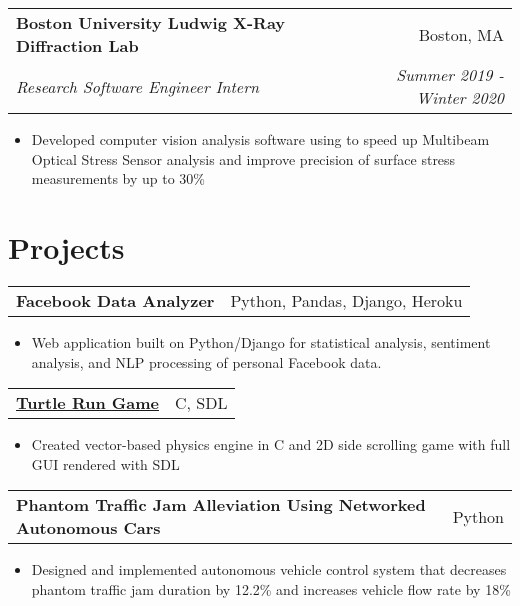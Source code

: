 \documentclass[letterpaper,11pt]{article}
\makeatletter
\newcommand{\resitem}[1]{\item[--] #1 \vspace{-8pt}}
\newcommand{\ressubheading}[4]{
	\vspace{6pt}
	\begin{tabular*}{7.5in}{l@{\extracolsep{\fill}}r}
			\textbf{#1} & #2 \\
			\textit{#3} & \textit{#4}
	\end{tabular*}
	\vspace{-12pt}
}
\newcommand{\projsubheading}[2]{
	\vspace{6pt}
	\begin{tabular*}{7.5in}{l@{\extracolsep{\fill}}r}
		\textbf{#1} & #2
	\end{tabular*}
	\vspace{-18pt}
}
\makeatother
\begin{document}
	\ressubheading{Boston University Ludwig X-Ray Diffraction Lab}{Boston, MA}{Research Software Engineer Intern}{Summer 2019 - Winter 2020}
		\begin{itemize}[leftmargin=*]
			\resitem{Developed computer vision analysis software using to speed up Multibeam Optical Stress Sensor analysis and improve precision of surface stress measurements by up to 30\%}
		\end{itemize}

\section{Projects}

		\projsubheading{Facebook Data Analyzer}{Python, Pandas, Django, Heroku}
			\begin{itemize}[leftmargin=*]
				\resitem{Web application built on Python/Django for statistical analysis, sentiment analysis, and NLP processing of personal Facebook data.}
			\end{itemize}
	
		\projsubheading{\href{https://github.com/derekqin8/turtle-run}{Turtle Run Game}}{C, SDL}
			\begin{itemize}[leftmargin=*]
				\resitem{Created vector-based physics engine in C and 2D side scrolling game with full GUI rendered with SDL}
			\end{itemize}

		\projsubheading{Phantom Traffic Jam Alleviation Using Networked Autonomous Cars}{Python}
			\begin{itemize}[leftmargin=*]
				\resitem{Designed and implemented autonomous vehicle control system that decreases phantom traffic jam duration by 12.2\% and increases vehicle flow rate by 18\%}
			\end{itemize}
	
\end{document}
